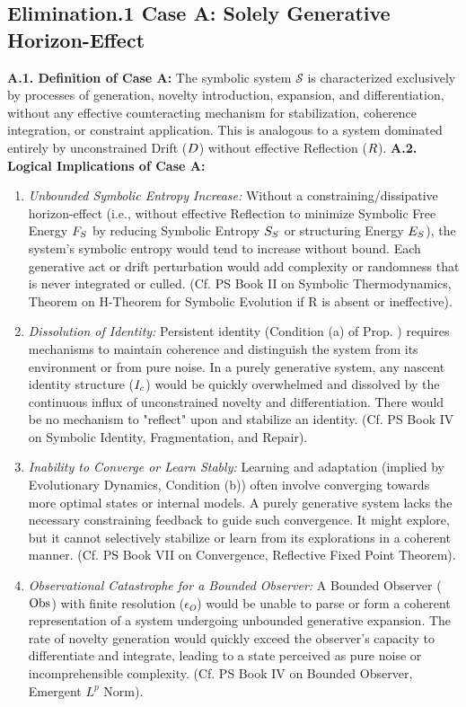 \subsection{Elimination.1 Case A: Solely Generative Horizon-Effect} \label{subsec:appC_case_a_solely_generative_horizon_effect}
\textbf{A.1. Definition of Case A:} The symbolic system \(\mathcal{S}\) is characterized exclusively by processes of generation, novelty introduction, expansion, and differentiation, without any effective counteracting mechanism for stabilization, coherence integration, or constraint application. This is analogous to a system dominated entirely by unconstrained Drift (\(D\)) without effective Reflection (\(R\)).
\textbf{A.2. Logical Implications of Case A:}
\begin{enumerate}
    \item \emph{Unbounded Symbolic Entropy Increase:} Without a constraining/dissipative horizon-effect (i.e., without effective Reflection to minimize Symbolic Free Energy \(F_S\) by reducing Symbolic Entropy \(S_S\) or structuring Energy \(E_S\)), the system's symbolic entropy would tend to increase without bound. Each generative act or drift perturbation would add complexity or randomness that is never integrated or culled. (Cf. PS Book II on Symbolic Thermodynamics, Theorem on H-Theorem for Symbolic Evolution if R is absent or ineffective).
    \item \emph{Dissolution of Identity:} Persistent identity (Condition (a) of Prop. ) requires mechanisms to maintain coherence and distinguish the system from its environment or from pure noise. In a purely generative system, any nascent identity structure (\(I_c\)) would be quickly overwhelmed and dissolved by the continuous influx of unconstrained novelty and differentiation. There would be no mechanism to "reflect" upon and stabilize an identity. (Cf. PS Book IV on Symbolic Identity, Fragmentation, and Repair).
    \item \emph{Inability to Converge or Learn Stably:} Learning and adaptation (implied by Evolutionary Dynamics, Condition (b)) often involve converging towards more optimal states or internal models. A purely generative system lacks the necessary constraining feedback to guide such convergence. It might explore, but it cannot selectively stabilize or learn from its explorations in a coherent manner. (Cf. PS Book VII on Convergence, Reflective Fixed Point Theorem).
    \item \emph{Observational Catastrophe for a Bounded Observer:} A Bounded Observer (\(\mathrm{Obs}\)) with finite resolution (\(\epsilon_O\)) would be unable to parse or form a coherent representation of a system undergoing unbounded generative expansion. The rate of novelty generation would quickly exceed the observer's capacity to differentiate and integrate, leading to a state perceived as pure noise or incomprehensible complexity. (Cf. PS Book IV on Bounded Observer, Emergent \(L^p\) Norm).
\end{enumerate}
